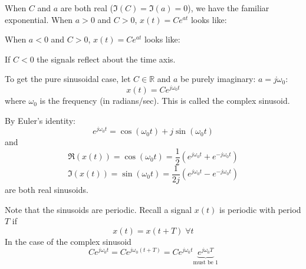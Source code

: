 When $C$ and $a$ are both real ($\Im(C) = \Im(a) = 0$), we have the familiar exponential. When $a > 0$ and $C > 0$, $x(t) = C e^{a t}$ looks like:

\begin{center}   
\end{center}

When $a < 0$ and $C > 0$, $x(t) = C e^{a t}$ looks like:

\begin{center}
\end{center}

If $C < 0$ the signals reflect about the time axis.


To get the pure sinusoidal case, let $C \in \mathbb{R}$ and $a$ be purely imaginary: $a = j\omega_0$:
\[
x(t) = Ce^{j\omega_0 t}
\]
where $\omega_0$ is the frequency (in radians/sec). This is called the complex sinusoid.

By Euler's identity:
\[
e^{j\omega_0 t} = \cos(\omega_0 t) + j\sin(\omega_0 t)
\]
and
\[
\Re(x(t)) = \cos(\omega_0 t) = \frac{1}{2}\left( e^{j\omega_0 t} + e^{-j\omega_0 t} \right)
\]
\[
\Im(x(t)) = \sin(\omega_0 t) = \frac{1}{2j}\left( e^{j\omega_0 t} - e^{-j\omega_0 t} \right)
\]
are both real sinusoids.

Note that the sinusoids are periodic. Recall a signal $x(t)$ is periodic with period $T$ if
\[
x(t) = x(t+T) \; \forall t
\]
In the case of the complex sinusoid
\[
Ce^{j\omega_0 t} = Ce^{j\omega_0 (t+T)}= Ce^{j\omega_0 t}\underbrace{e^{j\omega_0 T}}_{\text{must be 1}}
\]

